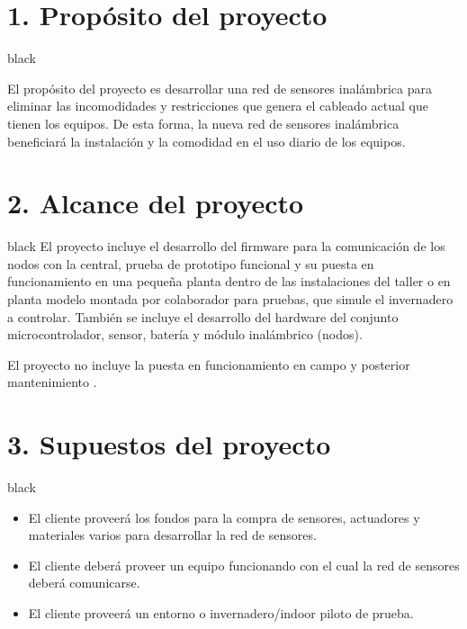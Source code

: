 \documentclass[11pt]{charter}
\begin{document}
\section{1. Propósito del proyecto}
\label{sec:proposito}

\begin{consigna}{black}

El propósito del proyecto es desarrollar una red de sensores inalámbrica para eliminar las incomodidades y restricciones que genera el cableado actual que tienen los equipos. De esta forma, la nueva red de sensores inalámbrica beneficiará la instalación y la comodidad en el uso diario de los equipos.
\end{consigna}

\section{2. Alcance del proyecto}
\label{sec:alcance}

\begin{consigna}{black}
El proyecto incluye el desarrollo del firmware para la comunicación de los nodos con la central, prueba de prototipo  funcional y su puesta en funcionamiento en una pequeña  planta  dentro de las instalaciones del  taller o en  planta modelo  montada por colaborador  para pruebas, que simule el  invernadero a controlar. También se incluye el desarrollo del hardware del conjunto microcontrolador, sensor, batería y módulo inalámbrico (nodos). 

El proyecto no incluye la puesta en funcionamiento en campo y posterior mantenimiento .

\end{consigna}


\section{3. Supuestos del proyecto}
\label{sec:supuestos}

\begin{consigna}{black}

\begin{itemize}
\item El cliente proveerá los fondos para la compra de sensores,  actuadores y materiales varios para desarrollar la red de sensores.
\item El cliente deberá proveer un equipo funcionando con el cual la red de sensores deberá comunicarse.
\item El cliente proveerá un entorno o invernadero/indoor piloto de prueba.
\end{itemize}

\end{consigna}
\end{document}
